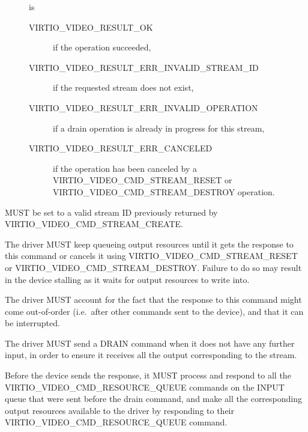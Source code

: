 \begin{description}
\item[]
is

\begin{description}
\item[VIRTIO\_VIDEO\_RESULT\_OK]
if the operation succeeded,
\item[VIRTIO\_VIDEO\_RESULT\_ERR\_INVALID\_STREAM\_ID]
if the requested stream does not exist,
\item[VIRTIO\_VIDEO\_RESULT\_ERR\_INVALID\_OPERATION]
if a drain operation is already in progress for this stream,
\item[VIRTIO\_VIDEO\_RESULT\_ERR\_CANCELED]
if the operation has been canceled by a
VIRTIO\_VIDEO\_CMD\_STREAM\_RESET or VIRTIO\_VIDEO\_CMD\_STREAM\_DESTROY
operation.
\end{description}
\end{description}


 MUST be set to a valid stream ID previously returned
by VIRTIO\_VIDEO\_CMD\_STREAM\_CREATE.

The driver MUST keep queueing output resources until it gets the
response to this command or cancels it using
VIRTIO\_VIDEO\_CMD\_STREAM\_RESET or
VIRTIO\_VIDEO\_CMD\_STREAM\_DESTROY. Failure to do so may result in the
device stalling as it waits for output resources to write into.

The driver MUST account for the fact that the response to this command
might come out-of-order (i.e.~after other commands sent to the device),
and that it can be interrupted.

The driver MUST send a DRAIN command when it does not have any further
input, in order to ensure it receives all the output corresponding to
the stream.


Before the device sends the response, it MUST process and respond to all
the VIRTIO\_VIDEO\_CMD\_RESOURCE\_QUEUE commands on the INPUT queue that
were sent before the drain command, and make all the corresponding
output resources available to the driver by responding to their
VIRTIO\_VIDEO\_CMD\_RESOURCE\_QUEUE command.

